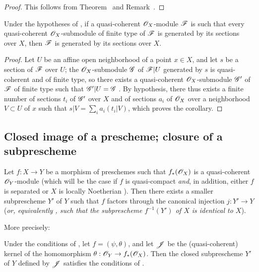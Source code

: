 \begin{proof}
This follows from Theorem~ and Remark~.
\end{proof}

\begin{corollary}[9.4.10]
\label{I.9.4.10}
Under the hypotheses of , if a quasi-coherent $\mathscr{O}_X$-module $\mathscr{F}$ is
such that every quasi-coherent $\mathscr{O}_X$-submodule of finite type of $\mathscr{F}$ is generated by
its sections over $X$, then $\mathscr{F}$ is generated by its sections over $X$.
\end{corollary}

\begin{proof}
Let $U$ be an affine open neighborhood of a point $x\in X$, and let $s$ be a
section of $\mathscr{F}$ over $U$; the $\mathscr{O}_X$-submodule $\mathscr{G}$ of $\mathscr{F}|U$ generated by $s$
is quasi-coherent and of finite type, so there exists a quasi-coherent $\mathscr{O}_X$-submodule
$\mathscr{G}'$ of $\mathscr{F}$ of finite type such that $\mathscr{G}'|U=\mathscr{G}$ . By
hypothesis, there thus exists a finite number of sections $t_i$ of $\mathscr{G}'$ over $X$ and of
sections $a_i$ of $\mathscr{O}_X$ over a neighborhood $V\subset U$ of $x$ such that
$s|V=\sum_i a_i(t_i|V)$, which proves the corollary.
\end{proof}

\subsection{Closed image of a prescheme; closure of a subprescheme}
\label{subsection:I.9.5}

\begin{proposition}[9.5.1]
\label{I.9.5.1}
Let $f:X\to Y$ be a morphism of preschemes such that $f_*(\mathscr{O}_X)$ is a quasi-coherent
$\mathscr{O}_Y$-module (which will be the case if $f$ is quasi-compact \emph{and}, in addition, either $f$ is separated or $X$ is locally Noetherian ). Then there exists a smaller
subprescheme $Y'$ of $Y$ such that $f$ factors through the canonical injection $j:Y'\to Y$
(\emph{or, equivalently , such that the subprescheme $f^{-1}(Y')$ of $X$ is
\emph{identical} to $X$}).
\end{proposition}

More precisely:
\begin{corollary}[9.5.2]
\label{I.9.5.2}
Under the conditions of , let $f=(\psi,\theta)$, and let $\mathscr{J}$ be the
(quasi-coherent) kernel of the homomorphism $\theta:\sh{O}_Y\to f_*(\sh{O}_X)$. Then the closed
subprescheme $Y'$ of $Y$ defined by $\mathscr{J}$ satisfies the conditions of .
\end{corollary}

